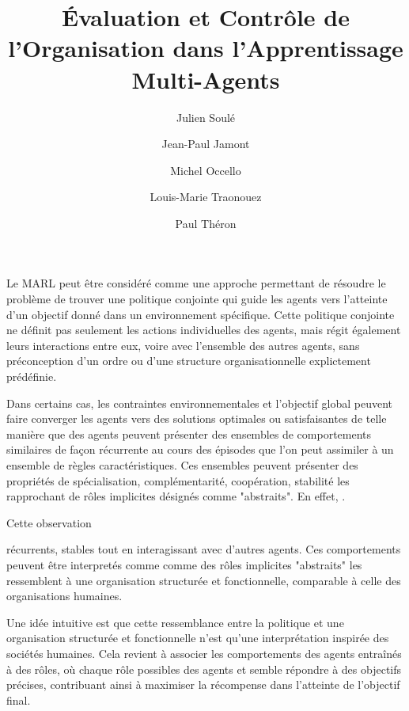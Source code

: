 \documentclass[sigconf,anonymous]{aamas}
\title[AAMAS-2025 CybMASDE]{Évaluation et Contrôle de l'Organisation dans l'Apprentissage Multi-Agents}
\author{Julien Soulé}
\affiliation{
  \institution{Univ. Grenoble Alpes}
  \city{Valence}
  \country{France}}
\author{Jean-Paul Jamont}
\affiliation{
  \institution{Univ. Grenoble Alpes}
  \city{Valence}
  \country{France}}
\author{Michel Occello}
\affiliation{
  \institution{Univ. Grenoble Alpes}
  \city{Valence}
  \country{France}}
\author{Louis-Marie Traonouez}
\affiliation{
  \institution{Thales Land and Air Systems, BU IAS}
  \city{Rennes}
  \country{France}}
\author{Paul Théron}
\affiliation{
  \institution{AICA IWG}
  \city{La Guillermie}
  \country{France}}
\begin{document}

\pagestyle{fancy}
\fancyhead{}


\maketitle



Le MARL peut être considéré comme une approche permettant de résoudre le problème de trouver une politique conjointe qui guide les agents vers l'atteinte d'un objectif donné dans un environnement spécifique.
Cette politique conjointe ne définit pas seulement les actions individuelles des agents, mais régit également leurs interactions entre eux, voire avec l'ensemble des autres agents, sans préconception d'un ordre ou d'une structure organisationnelle explictement prédéfinie.

Dans certains cas, les contraintes environnementales et l'objectif global peuvent faire converger les agents vers des solutions optimales ou satisfaisantes de telle manière que des agents peuvent présenter des ensembles de comportements similaires de façon récurrente au cours des épisodes que l'on peut assimiler à un ensemble de règles caractéristiques. Ces ensembles peuvent présenter des propriétés de spécialisation, complémentarité, coopération, stabilité les rapprochant de rôles implicites désignés comme "abstraits". En effet, .

Cette observation 

récurrents, stables tout en interagissant avec d'autres agents. Ces comportements peuvent être interpretés comme comme des rôles implicites "abstraits"  les  ressemblent à une organisation structurée et fonctionnelle, comparable à celle des organisations humaines.

Une idée intuitive est que cette ressemblance entre la politique et une organisation structurée et fonctionnelle n'est qu'une interprétation inspirée des sociétés humaines. Cela revient à associer les comportements des agents entraînés à des rôles, où chaque rôle possibles des agents et semble répondre à des objectifs précises, contribuant ainsi à maximiser la récompense dans l'atteinte de l'objectif final.
\end{document}
